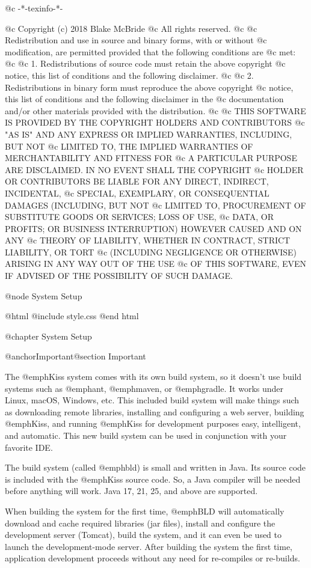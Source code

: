 @c -*-texinfo-*-

@c  Copyright (c) 2018 Blake McBride
@c  All rights reserved.
@c
@c  Redistribution and use in source and binary forms, with or without
@c  modification, are permitted provided that the following conditions are
@c  met:
@c
@c  1. Redistributions of source code must retain the above copyright
@c  notice, this list of conditions and the following disclaimer.
@c
@c  2. Redistributions in binary form must reproduce the above copyright
@c  notice, this list of conditions and the following disclaimer in the
@c  documentation and/or other materials provided with the distribution.
@c
@c  THIS SOFTWARE IS PROVIDED BY THE COPYRIGHT HOLDERS AND CONTRIBUTORS
@c  "AS IS" AND ANY EXPRESS OR IMPLIED WARRANTIES, INCLUDING, BUT NOT
@c  LIMITED TO, THE IMPLIED WARRANTIES OF MERCHANTABILITY AND FITNESS FOR
@c  A PARTICULAR PURPOSE ARE DISCLAIMED. IN NO EVENT SHALL THE COPYRIGHT
@c  HOLDER OR CONTRIBUTORS BE LIABLE FOR ANY DIRECT, INDIRECT, INCIDENTAL,
@c  SPECIAL, EXEMPLARY, OR CONSEQUENTIAL DAMAGES (INCLUDING, BUT NOT
@c  LIMITED TO, PROCUREMENT OF SUBSTITUTE GOODS OR SERVICES; LOSS OF USE,
@c  DATA, OR PROFITS; OR BUSINESS INTERRUPTION) HOWEVER CAUSED AND ON ANY
@c  THEORY OF LIABILITY, WHETHER IN CONTRACT, STRICT LIABILITY, OR TORT
@c  (INCLUDING NEGLIGENCE OR OTHERWISE) ARISING IN ANY WAY OUT OF THE USE
@c  OF THIS SOFTWARE, EVEN IF ADVISED OF THE POSSIBILITY OF SUCH DAMAGE.


@node System Setup

@html
@include style.css
@end html

@chapter System Setup

@anchor{Important}@section Important

The @emph{Kiss} system comes with its own build system, so it doesn't
use build systems such as @emph{ant}, @emph{maven}, or @emph{gradle}.
It works under Linux, macOS, Windows, etc. This included build system
will make things such as downloading remote libraries, installing and
configuring a web server, building @emph{Kiss}, and running
@emph{Kiss} for development purposes easy, intelligent, and automatic.
This new build system can be used in conjunction with your favorite IDE.

The build system (called @emph{bld}) is small and written in Java.
Its source code is included with the @emph{Kiss} source code.  So, a
Java compiler will be needed before anything will work.  
Java 17, 21, 25, and above are supported.

When building the system for the first time, @emph{BLD} will
automatically download and cache required libraries (jar files), install and
configure the development server (Tomcat), build the system, and it
can even be used to launch the development-mode server.  After building
the system the first time, application development proceeds without
any need for re-compiles or re-builds.

